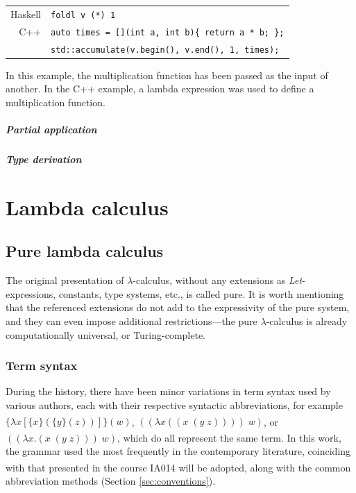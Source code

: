 \documentclass[table, a4paper, 10pt]{book}
\newcommand{\cit}[1]{\textsuperscript{\cite{#1}}}
\begin{document}
\vspace{2.4mm}
\hspace{8mm}
\begin{tabular}{rl}
       Haskell & \texttt{foldl v (*) 1}\\
            C++& \texttt{auto times = [](int a, int b)\{ return a * b; \};}\\
               & \texttt{std::accumulate(v.begin(), v.end(), 1, times);}
\end{tabular}

\noindent
In this example, the multiplication function has been passed as
the input of another. In the C++ example, a lambda
expression was used to define a multiplication function.

\paragraph{Partial application}

\paragraph{Type derivation}

\newpage 
\chapter{Lambda calculus}
\section{Pure lambda calculus}
The original presentation of $\lambda$-calculus, without any extensions as \textit{Let}-expressions,
constants, type systems, etc., is called pure. It is worth mentioning that the referenced extensions
do not add to the expressivity of the pure system, and they can even 
impose additional restrictions---the pure $\lambda$-calculus is already computationally universal, or Turing-complete.

\subsection{Term syntax}
During the history, there have been minor variations in term syntax
used by various authors, each with their respective
syntactic abbreviations, for example
$\{\lambda x[\{x\}(\{y\} (z))]\}(w)$,\cit{churchPaper}
$((\lambda x((x\;(y\;z))))\;w)$,\cit{zlatuska} or
$((\lambda x.(x\;(y\;z)))\;w)$,\cit{hudak} which do all
represent the same term. In this work, the grammar used the most
frequently in the contemporary literature, coinciding with that
presented in the course IA014\cit{slides} will be adopted, along with the common
abbreviation methods (Section \ref{sec:conventions}).
\end{document}
